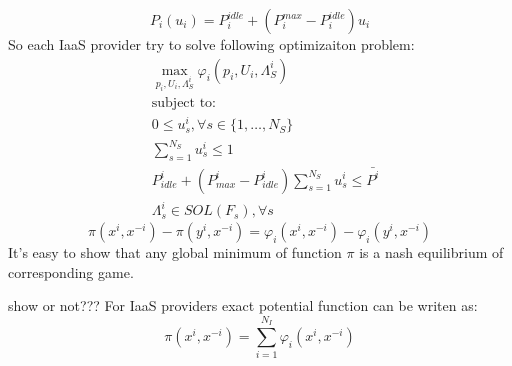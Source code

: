 \documentclass[conference]{IEEEtran}
\begin{document}
    \begin{equation}
      P_i(u_i) = P_i^{idle} + (P_i^{max} - P_i^{idle}) u_i
    \end{equation}
    So each IaaS provider try to solve following optimizaiton problem:
    \begin{subequations}
      \begin{align}
        &\max_{p_i, U_i,\Lambda^i_S} \varphi_i(p_i, U_i, \Lambda^i_S)\\
        &\text{subject to:} \nonumber\\
        &0 \le u_s^i, \forall s \in \{1, \hdots, N_S\} \\
        &\sum_{s=1}^{N_S}u_s^i \le 1 \\
        &P_{idle}^i + (P_{max}^i - P_{idle}^i)\sum_{s=1}^{N_S}u_s^i \le \bar{P^i} \\
        &\Lambda_s^i \in SOL(F_s), \forall s
      \end{align}
    \end{subequations}
    \begin{equation}
      \pi(x^i,x^{-i}) - \pi(y^i,x^{-i}) = \varphi_i(x^i,x^{-i}) - \varphi_i(y^i,x^{-i})
    \end{equation}
    It's easy to show that any global minimum of function $\pi$ is a nash equilibrium of corresponding game.

    show or not???
    For IaaS providers exact potential function can be writen as:
    \begin{equation}
      \pi(x^i, x^{-i}) = \sum_{i=1}^{N_I} \varphi_i(x^i, x^{-i})
    \end{equation}
\end{document}
